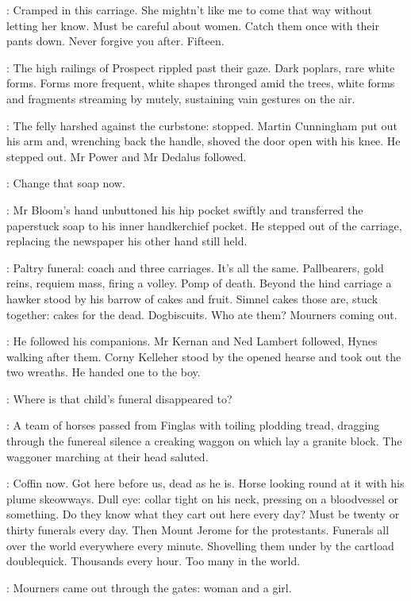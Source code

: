 \BloomInt:
Cramped in this carriage.
She mightn't like me to come that way without letting her know.
Must be careful about women.
Catch them once with their pants down.
Never forgive you after.
Fifteen.

:
The high railings of Prospect rippled past their gaze.
Dark poplars, rare white forms.
Forms more frequent,
white shapes thronged amid the trees,
white forms and fragments streaming by mutely,
sustaining vain gestures on the air.

:
The felly harshed against the curbstone:
stopped.
Martin Cunningham put out his arm
and, wrenching back the handle,
shoved the door open with his knee.
He stepped out.
Mr Power and Mr Dedalus followed.

\BloomInt:
Change that soap now.

:
Mr Bloom's hand unbuttoned his hip pocket swiftly
and transferred the paperstuck soap to his inner handkerchief pocket.
He stepped out of the carriage,
replacing the newspaper his other hand still held.

\BloomInt:
Paltry funeral:
coach and three carriages.
It's all the same.
Pallbearers, gold reins, requiem mass, firing a volley.
Pomp of death.
Beyond the hind carriage
a hawker stood by his barrow of cakes and fruit.
Simnel cakes those are, stuck together:
cakes for the dead.
Dogbiscuits.
Who ate them?
Mourners coming out.

:
He followed his companions.
Mr Kernan and Ned Lambert followed,
Hynes walking after them.
Corny Kelleher stood by the opened hearse and took out the two wreaths.
He handed one to the boy.

\BloomInt:
Where is that child's funeral disappeared to?

:
A team of horses passed from Finglas with toiling plodding tread,
dragging through the funereal silence a creaking waggon
on which lay a granite block.
The waggoner marching at their head saluted.

\BloomInt:
Coffin now.
Got here before us, dead as he is.
Horse looking round at it with his plume skeowways.
Dull eye:
collar tight on his neck,
pressing on a bloodvessel or something.
Do they know what they cart out here every day?
Must be twenty or thirty funerals every day.
Then Mount Jerome for the protestants.
Funerals all over the world
everywhere every minute.
Shovelling them under by the cartload doublequick.
Thousands every hour.
Too many in the world.

:
Mourners came out through the gates:
woman and a girl.

